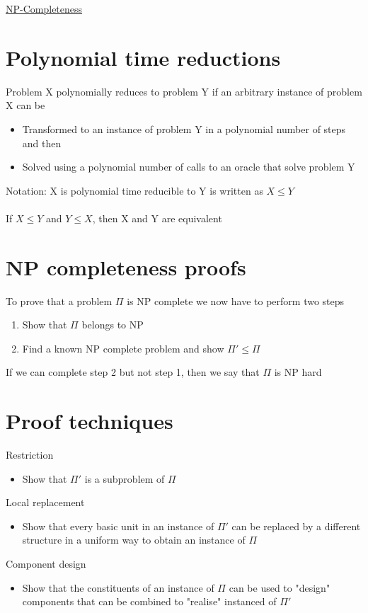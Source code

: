 \documentclass{article}[18pt]
\begin{document}
\begin{center}
\underline{\huge NP-Completeness}
\end{center}
\section{Polynomial time reductions}
Problem X polynomially reduces to problem Y if an arbitrary instance of problem X can be
\begin{itemize}
	\item Transformed to an instance of problem Y in a polynomial number of steps and then
	\item Solved using a polynomial number of calls to an oracle that solve problem Y
\end{itemize}
Notation: X is polynomial time reducible to Y is written as $X\leqslant Y$\\
\\
If $X\leqslant Y$ and $Y\leqslant X$, then X and Y are equivalent
\section{NP completeness proofs}
To prove that a problem $\Pi$ is NP complete we now have to perform two steps
\begin{enumerate}
	\item Show that $\Pi$ belongs to NP
	\item Find a known NP complete problem and show $\Pi'\leqslant \Pi$
\end{enumerate}
If we can complete step 2 but not step 1, then we say that $\Pi$ is NP hard
\section{Proof techniques}
Restriction
\begin{itemize}
	\item Show that $\Pi'$ is a subproblem of $\Pi$
\end{itemize}
Local replacement
\begin{itemize}
	\item Show that every basic unit in an instance of $\Pi'$ can be replaced by a different structure in a uniform way to obtain an instance of $\Pi$
\end{itemize}
Component design
\begin{itemize}
	\item Show that the constituents of an instance of $\Pi$ can be used to "design" components that can be combined to "realise" instanced of $\Pi'$
\end{itemize}
\end{document}
